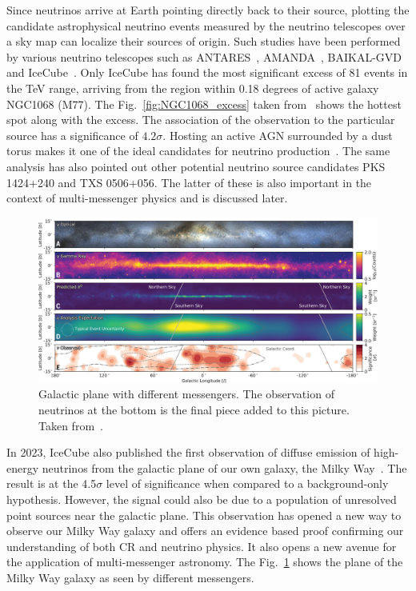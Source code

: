   Since neutrinos arrive at Earth pointing directly back to their source, plotting the candidate astrophysical neutrino events measured by the neutrino telescopes over a sky map can localize their sources of origin. Such studies have been performed by various neutrino telescopes such as ANTARES~\cite{Albert_2021}, AMANDA~\cite{Abbasi_2009_Amanda}, BAIKAL-GVD~\cite{Allakhverdyan_2023} and IceCube~\cite{Icecube_2022}. Only IceCube has found the most significant excess of 81 events in the TeV range, arriving from the region within 0.18 degrees of active galaxy NGC1068 (M77). The Fig.~\ref{fig:NGC1068_excess} taken from~\cite{Icecube_2022} shows the hottest spot along with the excess. The association of the observation to the particular source has a significance of $4.2\sigma$. Hosting an active AGN surrounded by a dust torus makes it one of the ideal candidates for neutrino production~\cite{eichler1979high,berezinsky1981high}. The same analysis has also pointed out other potential neutrino source candidates PKS 1424+240 and TXS 0506+056. The latter of these is also important in the context of multi-messenger physics and is discussed later. 

  \begin{figure}[t!]
    \centering
    \includegraphics[width=14.5cm]{thesis_figures/CRnNu/science-adc9818-f1.jpg}
    \caption{Galactic plane with different messengers. The observation of neutrinos at the bottom is the final piece added to this picture. Taken from~\cite{Galactic_plane_nu_2023}.}
    \label{fig:Galactic_plane_nu_messengers}
  \end{figure}

  In 2023, IceCube also published the first observation of diffuse emission of high-energy neutrinos from the galactic plane of our own galaxy, the Milky Way~\cite{Galactic_plane_nu_2023}. The result is at the 4.5$\sigma$ level of significance when compared to a background-only hypothesis. However, the signal could also be due to a population of unresolved point sources near the galactic plane. This observation has opened a new way to observe our Milky Way galaxy and offers an evidence based proof confirming our understanding of both \gls{CR} and neutrino physics. It also opens a new avenue for the application of multi-messenger astronomy. The Fig.~\ref{fig:Galactic_plane_nu_messengers} shows the plane of the Milky Way galaxy as seen by different messengers.
  
